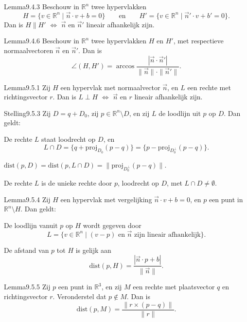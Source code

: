 \begin{res}{Lemma}{9.4.3}
Beschouw in $\mathbb R^n$ twee hypervlakken
\[
H=\{v\in\mathbb R^n \mid \vec n\cdot v+b=0\} \qquad\text{en}\qquad H'=\{v\in\mathbb R^n\mid \vec n'\cdot v+b'=0\}.
\]
Dan is $H\parallel H'$ \(\iff\) $\vec n$ en $\vec n'$ lineair afhankelijk zijn.
\end{res}

\begin{res}{Lemma}{9.4.6}
Beschouw in $\mathbb R^n$ twee hypervlakken $H$ en $H'$, met respectieve normaalvectoren $\vec n$ en $\vec n'$. Dan is
\[
\angle(H,H')=\arccos\frac{|\vec n\cdot \vec n'|}{\|\vec n\|\cdot\|\vec n'\|}.
\]
\end{res}

\begin{res}{Lemma}{9.5.1}
Zij $H$ een hypervlak met normaalvector $\vec n$, en $L$ een rechte met richtingsvector $r$. Dan is $L\perp H$ \(\iff\) $\vec n$ en $r$ lineair afhankelijk zijn.
\end{res}

\begin{res}{Stelling}{9.5.3}
Zij $D=q+D_0$, zij $p\in\mathbb R^n\setminus D$, en zij $L$ de loodlijn uit $p$ op $D$. Dan geldt:
\begin{myenum}
\item De rechte $L$ staat loodrecht op $D$, en
\[
L\cap D=\{q+\mathrm{proj}_{D_0}(p-q)\}=\{p-\mathrm{proj}_{D_0^\perp}(p-q)\}.
\]
\item $\mathrm{dist}(p,D)=\mathrm{dist}(p,L\cap D)=\|\mathrm{proj}_{D_0^\perp}(p-q)\|$.
\item De rechte $L$ is de unieke rechte door $p$, loodrecht op $D$, met $L\cap D\ne\emptyset$.
\end{myenum}
\end{res}

\begin{res}{Lemma}{9.5.4}
Zij $H$ een hypervlak met vergelijking $\vec n\cdot v+b=0$, en $p$ een punt in $\mathbb R^n\setminus H$. Dan geldt:
\begin{myenum}
\item De loodlijn vanuit $p$ op $H$ wordt gegeven door
\[
L=\{v\in\mathbb R^n \mid (v-p) \text{ en } \vec n \text{ zijn lineair afhankelijk}\}.
\]
\item De afstand van $p$ tot $H$ is gelijk aan
\[
\mathrm{dist}(p,H)=\frac{|\vec n\cdot p+b|}{\|\vec n\|}.
\]
\end{myenum}
\end{res}

\begin{res}{Lemma}{9.5.5}
Zij $p$ een punt in $\mathbb R^3$, en zij $M$ een rechte met plaatsvector $q$ en richtingsvector $r$. Veronderstel dat $p\notin M$. Dan is
\[
\mathrm{dist}(p,M)=\frac{\|r\times(p-q)\|}{\|r\|}.
\]
\end{res}

